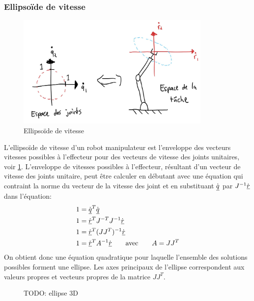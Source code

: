 \subsubsection{Ellipsoïde de vitesse}

\begin{figure}[H]
	\centering
		\includegraphics[width=0.85\textwidth]{fig/manipulabilityellipsoid.jpg}
	\caption{Ellipsoïde de vitesse}
	\label{fig:manipulabilityellipsoid}
\end{figure}

L'ellipsoïde de vitesse d'un robot manipulateur est l'enveloppe des vecteurs vitesses possibles à l'effecteur pour des vecteurs de vitesse des joints unitaires, voir \ref{fig:manipulabilityellipsoid}. L'enveloppe de vitesses possibles à l'effecteur, résultant d'un vecteur de vitesse des joints unitaire, peut être calculer en débutant avec une équation qui contraint la norme du vecteur de la vitesse des joint et en substituant $\dot{\underline{q}}$ par $J^{-1} \dot{\underline{r}}$ dans l'équation:
\begin{align}
1 &= \dot{\underline{q}}^T \dot{\underline{q}} \\
1 &= \dot{\underline{r}}^T J^{-T} J^{-1} \dot{\underline{r}} \\
1 &= \dot{\underline{r}}^T (J J^T)^{-1} \dot{\underline{r}} \\
1 &= \dot{\underline{r}}^T A^{-1} \dot{\underline{r}} \quad\quad \text{avec} \quad\quad A = J J^T
\end{align} 
On obtient donc une équation quadratique pour laquelle l'ensemble des solutions possibles forment une ellipse. Les axes principaux de l'ellipse correspondent aux valeurs propres et vecteurs propres de la matrice $J J^T$. 

\begin{figure}[H]
	\centering
	\caption{TODO: ellipse 3D}
\end{figure}

